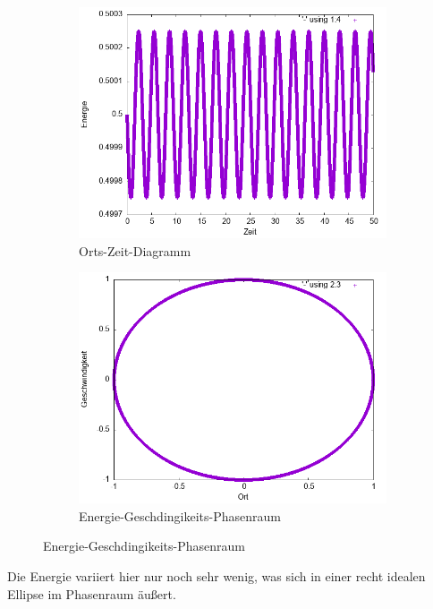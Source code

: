 \documentclass[
    oneside,
    ngerman,
    footinclude=false,
    captions=tableheading,
    DIV=12
]{scrartcl}
\begin{document}
                \begin{figure}[H]
                \centering
                \begin{subfigure}[b]{0.45\textwidth}
                    \centering
                    \includegraphics[width=\textwidth]{Bilddateien/expEulerA1(a)-0001-E.png}
                    \caption{Orts-Zeit-Diagramm}
                    \label{fig:expEulerA1(a)-0001-0-E}
                \end{subfigure}
                \hfill
                \begin{subfigure}[b]{0.45\textwidth}
                    \centering
                    \includegraphics[width=\textwidth]{Bilddateien/expEulerA1(a)-0001-0-xv.png}
                    \caption{Energie-Geschdingikeits-Phasenraum}
                    \label{fig:expEulerA1(a)-0001-0-xv}
                \end{subfigure}
            \end{figure}
            Die Energie variiert hier nur noch sehr wenig, was sich in einer recht idealen Ellipse im Phasenraum äußert.
\end{document}
